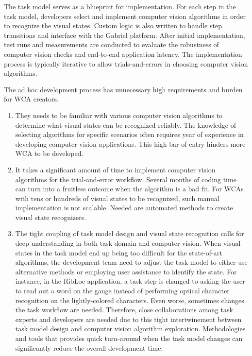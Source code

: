 The task model serves as a blueprint for implementation. For each step in the
task model, developers select and implement computer vision algorithms in order
to recognize the visual states. Custom logic is also written to handle step
transitions and interface with the Gabriel platform. After initial
implementation, test runs and measurements are conducted to evaluate the
robustness of computer vision checks and end-to-end application latency. The
implementation process is typically iterative to allow trials-and-errors in
choosing computer vision algorithms.

The ad hoc development process has unnecessary high requirements and burden for
WCA creators.
\begin{enumerate}
  \item They needs to be familiar with various computer vision algorithms to determine
what visual states can be recognized reliably. The knowledge of selecting
algorithms for specific scenarios often requires year of experience in
developing computer vision applications. This high bar of entry hinders more
WCA to be developed.
  \item It takes a significant amount of time to implement computer vision
algorithms for the trial-and-error workflow. Several months of coding time can
turn into a fruitless outcome when the algorithm is a bad fit. For WCAs with
tens or hundreds of visual states to be recognized, such manual implementation
is not scalable. Needed are automated methods to create visual state recognizers.
  \item The tight coupling of task model design and visual state recognition
calls for deep understanding in both task domain and computer vision. When
visual states in the task model end up being too difficult for the state-of-art
algorithms, the development team need to adjust the task model to either use
alternative methods or employing user assistance to identify the state. For
instance, in the RibLoc application, a task step is changed to asking the user
to read out a word on the gauge instead of performing optical character
recognition on the lightly-colored characters. Even worse, sometimes changes the
task workflow are needed. Therefore, close collaborations among task experts and
developers are needed due to this tight intertwinement between task model design
and computer vision algorithm exploration. Methodologies and tools that provides
quick turn-around when the task model changes can significantly reduce the
overall development time.
\end{enumerate}


